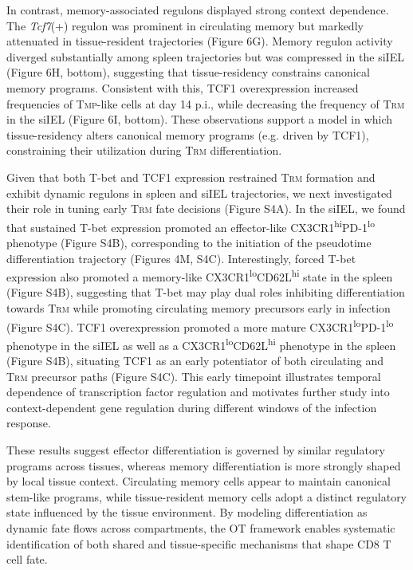 In contrast, memory-associated regulons displayed strong context
dependence. The \emph{Tcf7}(+) regulon was prominent in circulating
memory but markedly attenuated in tissue-resident trajectories (Figure
6G). Memory regulon activity diverged substantially among spleen
trajectories but was compressed in the siIEL (Figure 6H, bottom),
suggesting that tissue-residency constrains canonical memory programs.
Consistent with this, TCF1 overexpression increased frequencies of
T\textsc{mp}-like cells at day 14 p.i., while decreasing the frequency
of T\textsc{rm} in the siIEL (Figure 6I, bottom). These observations
support a model in which tissue-residency alters canonical memory
programs (e.g. driven by TCF1), constraining their utilization during
T\textsc{rm} differentiation.

Given that both T-bet and TCF1 expression restrained T\textsc{rm}
formation and exhibit dynamic regulons in spleen and siIEL trajectories,
we next investigated their role in tuning early T\textsc{rm} fate
decisions (Figure S4A). In the siIEL, we found that sustained T-bet
expression promoted an effector-like
CX3CR1\textsuperscript{hi}PD-1\textsuperscript{lo} phenotype (Figure
S4B), corresponding to the initiation of the pseudotime differentiation
trajectory (Figures 4M, S4C). Interestingly, forced T-bet expression
also promoted a memory-like
CX3CR1\textsuperscript{lo}CD62L\textsuperscript{hi} state in the spleen
(Figure S4B), suggesting that T-bet may play dual roles inhibiting
differentiation towards T\textsc{rm} while promoting circulating memory
precursors early in infection (Figure S4C). TCF1 overexpression promoted
a more mature CX3CR1\textsuperscript{lo}PD-1\textsuperscript{lo}
phenotype in the siIEL as well as a
CX3CR1\textsuperscript{lo}CD62L\textsuperscript{hi} phenotype in the
spleen (Figure S4B), situating TCF1 as an early potentiator of both
circulating and T\textsc{rm} precursor paths (Figure S4C). This early
timepoint illustrates temporal dependence of transcription factor
regulation and motivates further study into context-dependent gene
regulation during different windows of the infection response.

These results suggest effector differentiation is governed by similar
regulatory programs across tissues, whereas memory differentiation is
more strongly shaped by local tissue context. Circulating memory cells
appear to maintain canonical stem-like programs, while tissue-resident
memory cells adopt a distinct regulatory state influenced by the tissue
environment. By modeling differentiation as dynamic fate flows across
compartments, the OT framework enables systematic identification of both
shared and tissue-specific mechanisms that shape CD8 T cell fate.

